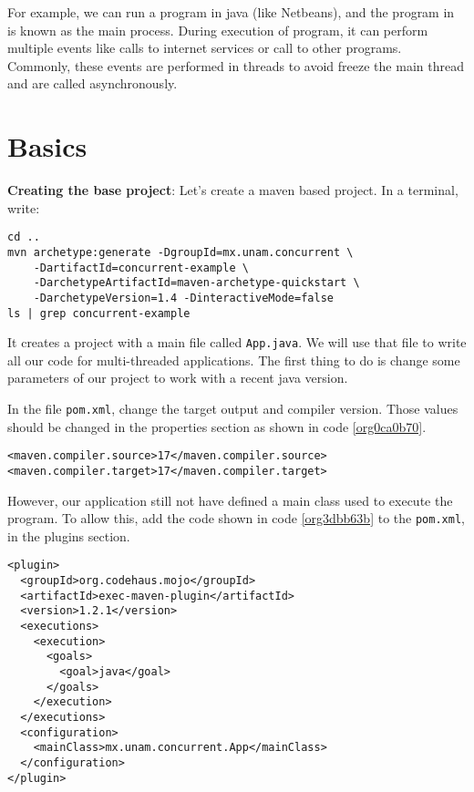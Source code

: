 \documentclass{latex/classes/myarticle}
\begin{document}
For example, we can run a program in java (like Netbeans), and the
program in is known as the main process. During execution of program, it
can perform multiple events like calls to internet services or call to other
programs. Commonly, these events are performed in threads to avoid freeze the
main thread and are called asynchronously.

\section{Basics}
\label{sec:org67ad031}


\textbf{Creating the base project}: Let's create a maven based project. In a terminal,
write:

\begin{lstlisting}
cd ..
mvn archetype:generate -DgroupId=mx.unam.concurrent \
    -DartifactId=concurrent-example \
    -DarchetypeArtifactId=maven-archetype-quickstart \
    -DarchetypeVersion=1.4 -DinteractiveMode=false
ls | grep concurrent-example
\end{lstlisting}

It creates a project with a main file called \texttt{App.java}. We will use that file
to write all our code for multi-threaded applications. The first thing to do
is change some parameters of our project to work with a recent java version.

In the file \texttt{pom.xml}, change the target output and compiler version. Those
values should be changed in the properties section as shown in code
\ref{org0ca0b70}.

\begin{lstlisting}
<maven.compiler.source>17</maven.compiler.source>
<maven.compiler.target>17</maven.compiler.target>
\end{lstlisting}

However, our application still not have defined a main class used to execute
the program. To allow this, add the code shown in code \ref{org3dbb63b} to the \texttt{pom.xml},
in the plugins section.

\begin{lstlisting}
<plugin>
  <groupId>org.codehaus.mojo</groupId>
  <artifactId>exec-maven-plugin</artifactId>
  <version>1.2.1</version>
  <executions>
    <execution>
      <goals>
        <goal>java</goal>
      </goals>
    </execution>
  </executions>
  <configuration>
    <mainClass>mx.unam.concurrent.App</mainClass>
  </configuration>
</plugin>
\end{lstlisting}
\end{document}
